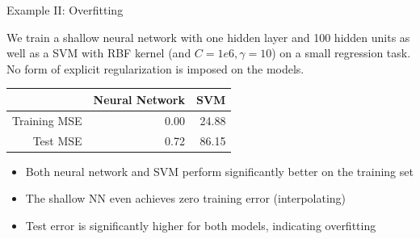 \documentclass[11pt,compress,t,notes=noshow, xcolor=table]{beamer}
\begin{document}
\begin{vbframe}{Example II: Overfitting}

We train a shallow neural network with one hidden layer and 100 hidden units as well as a SVM with RBF kernel (and $C=1e6, \gamma=10$) on a small regression task. No form of explicit regularization is imposed on the models. %
\vspace{0.2cm}
\begin{table}[ht]
\centering
\begin{tabular}{rrr}
  \hline
 & Neural Network & SVM \\ 
  \hline
Training MSE & 0.00 & 24.88 \\ 
  Test MSE & 0.72 & 86.15 \\ 
   \hline
\end{tabular}
\end{table}
\vspace{0.3cm}
\begin{itemize}
    \item Both neural network and SVM perform significantly better on the training set
    \item The shallow NN even achieves zero training error (interpolating)
    \item Test error is significantly higher for both models, indicating overfitting
\end{itemize}

\end{vbframe}
\end{document}
